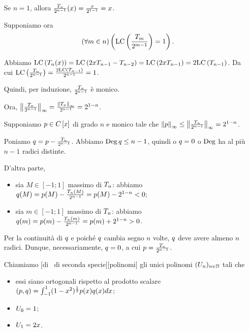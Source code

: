 \Proof Se $n = 1$, allora $\frac{T_n}{2^{n - 1}}(x) = \frac{x}{2^{1 - 1}} = x$.
\par Supponiamo ora
\[
	\left ( \forall m \in n \right ) \left ( \text{LC} \left ( \frac{T_m}{2^{m - 1}} \right ) = 1 \right ).
\]
\par Abbiamo $\text{LC} \left ( T_n(x) \right ) = \text{LC} \left ( 2xT_{n - 1} - T_{n - 2} \right ) = \text{LC} \left ( 2xT_{n - 1} \right ) = 2\text{LC} \left ( T_{n - 1} \right )$. Da cui $\text{LC} \left ( \frac{T_n}{2^{n - 1}} \right ) = \frac{2 \text{LC} \left ( T_{n - 1} \right )}{2^{n - 1}} = 1$.
\par Quindi, per induzione, $\frac{T_n}{2^{n - 1}}$ \`e monico.
\par Ora, $\Norm{\frac{\FirstChebyshevPolynomial_n}{2^{n - 1}}}[\infty] = \frac{\Norm{\FirstChebyshevPolynomial_n}[\infty]}{2^{n - 1}} = 2^{1 - n}$.
\par Supponiamo $p \in C \left [ x \right ]$ di grado $n$ e monico tale che $\Norm{\Polynomial}[\infty] \leq \Norm{\frac{\FirstChebyshevPolynomial_n}{2^{n - 1}}}[\infty] = 2^{1 - n}$.
\par Poniamo $q = p - \frac{T_n}{2^{n - 1}}$. Abbiamo $\operatorname{\operatorname{Deg}}{q} \leq n - 1$, quindi o $q = 0$ o $\operatorname{\operatorname{Deg}}$ ha al pi\`u $n - 1$ radici distinte.
\par D'altra parte,
\begin{itemize}
	\item sia $M \in [-1;1]$ massimo di $T_n$: abbiamo $q(M) = p(M) - \frac{T_n(M)}{2^{n - 1}} = p(M) - 2^{1 - n} < 0$;
	\item sia $m \in [-1;1]$ massimo di $T_n$: abbiamo $q(m) = p(m) - \frac{T_n(m)}{2^{n - 1}} = p(m) + 2^{1 - n} > 0$.
\end{itemize}
\par Per la continuit\`a di $q$ e poich\'e $q$ cambia segno $n$ volte, $q$ deve avere almeno $n$ radici. Dunque, necessariamente, $q = 0$, a cui $p = \frac{T_n}{2^{n - 1}}$. \EndProof
\begin{Definition}
	Chiamiamo [di \Chebyshev\ di seconda specie][polinomi] gli unici polinomi $(U_n)_{n \in \mathbb{N}}$ tali che
	\begin{itemize}
		\item essi siano ortogonali rispetto al prodotto scalare $\left ( p , q \right ) = \int_{-1}^1 (1 - x^2)^{\frac{1}{2}} p(x)q(x)dx$;
		\item $U_0 = 1$;
		\item $U_1 = 2x$.
	\end{itemize}
\end{Definition}
